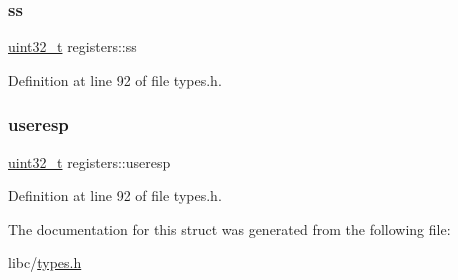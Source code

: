 \subsubsection{\texorpdfstring{ss}{ss}}
{\footnotesize\ttfamily \hyperlink{a00140_a435d1572bf3f880d55459d9805097f62_a435d1572bf3f880d55459d9805097f62}{uint32\+\_\+t} registers\+::ss}



Definition at line 92 of file types.\+h.

\mbox{\label{a00264_ad4734529e5faf04f6c61cfabfe4324e9_ad4734529e5faf04f6c61cfabfe4324e9}} 
\subsubsection{\texorpdfstring{useresp}{useresp}}
{\footnotesize\ttfamily \hyperlink{a00140_a435d1572bf3f880d55459d9805097f62_a435d1572bf3f880d55459d9805097f62}{uint32\+\_\+t} registers\+::useresp}



Definition at line 92 of file types.\+h.



The documentation for this struct was generated from the following file\+:\begin{DoxyCompactItemize}
\item 
libc/\hyperlink{a00140}{types.\+h}\end{DoxyCompactItemize}
